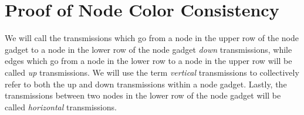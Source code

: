 \documentclass{article}
\begin{document}





\appendix


\section{Proof of Node Color Consistency}\label{sec:colorc}

We will call the transmissions which go from a node in the upper row of the node gadget to a node in the lower row of the node gadget \emph{down} transmissions, while edges which go from a node in the lower row to a node in the upper row will be called \emph{up} transmissions.  We will use the term \emph{vertical} transmissions to collectively refer to both the up and down transmissions within a node gadget.  Lastly, the transmissions between two nodes in the lower row of the node gadget will be called \emph{horizontal} transmissions.
\end{document}
